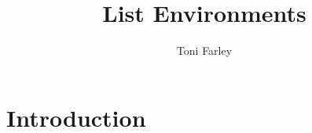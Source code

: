 \documentclass{article}
\title{List Environments}
\author{Toni Farley}
\date{}
\begin{document}
\maketitle



\section{Introduction}
\end{document}
